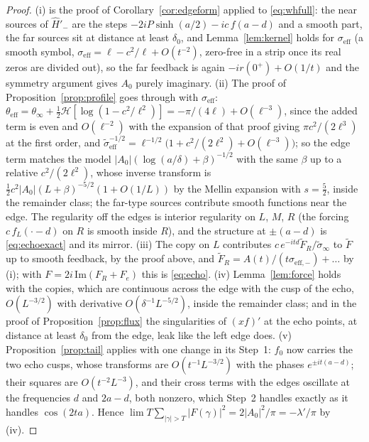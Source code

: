 \documentclass[11pt]{article}
\theoremstyle{definition}
\theoremstyle{remark}
\begin{document}
\begin{proof}
(i) is the proof of Corollary~\ref{cor:edgeform} applied to \eqref{eq:whfull}: the near sources of $\hat H'_-$ are the steps $-2iP\sinh(a/2)-ic\,f(a-d)$ and a smooth part, the far sources sit at distance at least $\delta_0$, and Lemma~\ref{lem:kernel} holds for $\sigma_{\mathrm{eff}}$ (a smooth symbol, $\sigma_{\mathrm{eff}}=\ell-c^2/\ell+O(t^{-2})$, zero-free in a strip once its real zeros are divided out), so the far feedback is again $-ir(0^+)+O(1/t)$ and the symmetry argument gives $A_0$ purely imaginary. (ii) The proof of Proposition~\ref{prop:profile} goes through with $\sigma_{\mathrm{eff}}$: $\theta_{\mathrm{eff}}=\theta_\infty+\tfrac12\mathcal H[\log(1-c^2/\ell^2)]=-\pi/(4\ell)+O(\ell^{-3})$, since the added term is even and $O(\ell^{-2})$ with the expansion of that proof giving $\pi c^2/(2\ell^3)$ at the first order, and $\tilde\sigma_{\mathrm{eff}}^{-1/2}=\ell^{-1/2}\big(1+c^2/(2\ell^2)+O(\ell^{-3})\big)$; so the edge term matches the model $|A_0|(\log(a/\delta)+\beta)^{-1/2}$ with the same $\beta$ up to a relative $c^2/(2\ell^2)$, whose inverse transform is $\tfrac12c^2|A_0|(L+\beta)^{-5/2}(1+O(1/L))$ by the Mellin expansion with $s=\tfrac52$, inside the remainder class; the far-type sources contribute smooth functions near the edge. The regularity off the edges is interior regularity on $L$, $M$, $R$ (the forcing $c\,f_L(\cdot-d)$ on $R$ is smooth inside $R$), and the structure at $\pm(a-d)$ is \eqref{eq:echoexact} and its mirror. (iii) The copy on $L$ contributes $c\,e^{-itd}\tilde F_R/\tilde\sigma_\infty$ to $\tilde F$ up to smooth feedback, by the proof above, and $\tilde F_R=A(t)/(t\sigma_{\mathrm{eff},-})+\dots$ by (i); with $F=2i\,\mathrm{Im}(F_R+F_e)$ this is \eqref{eq:echo}. (iv) Lemma~\ref{lem:force} holds with the copies, which are continuous across the edge with the cusp of the echo, $O(L^{-3/2})$ with derivative $O(\delta^{-1}L^{-5/2})$, inside the remainder class; and in the proof of Proposition~\ref{prop:flux} the singularities of $(xf)'$ at the echo points, at distance at least $\delta_0$ from the edge, leak like the left edge does. (v) Proposition~\ref{prop:tail} applies with one change in its Step~1: $f_0$ now carries the two echo cusps, whose transforms are $O(t^{-1}L^{-3/2})$ with the phases $e^{\pm it(a-d)}$; their squares are $O(t^{-2}L^{-3})$, and their cross terms with the edges oscillate at the frequencies $d$ and $2a-d$, both nonzero, which Step~2 handles exactly as it handles $\cos(2ta)$. Hence $\lim T\sum_{|\gamma|>T}|F(\gamma)|^2=2|A_0|^2/\pi=-\lambda'/\pi$ by (iv).
\end{proof}
\end{document}
